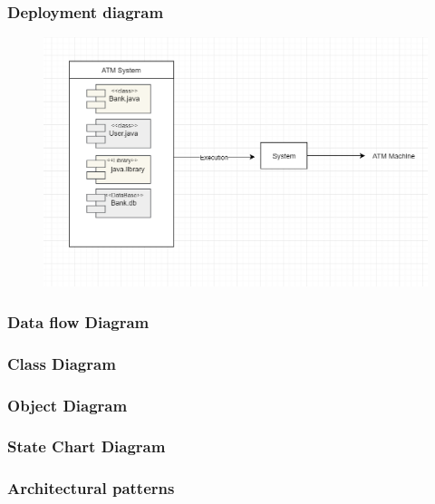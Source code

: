 \documentclass{article}
\begin{document}
	\newpage\subsubsection{Deployment diagram}
		\begin{figure}[h!]
			\begin{center}
				\includegraphics[width=\linewidth]{img/deployment.png}
			\end{center}
		\end{figure}
	\newpage\subsubsection{Data flow Diagram}		
	\newpage\subsubsection{Class Diagram}
	\newpage\subsubsection{Object Diagram}		
	\newpage\subsubsection{State Chart Diagram}
	\newpage\subsubsection{Architectural patterns}


	\newpage
	
	
\end{document}
